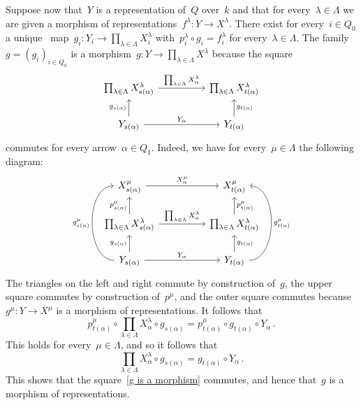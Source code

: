 Suppose now that~$Y$ is a representation of~$Q$ over~$k$ and that for every~$\lambda \in \Lambda$ we are given a morphism of representations~$f^\lambda \colon Y \to X^\lambda$.
There exist for every~$i \in Q_0$ a unique~{\klin} map~$g_i \colon Y_i \to \prod_{\lambda \in \Lambda} X^\lambda_i$ with~$p^\lambda_i \circ g_i = f^\lambda_i$ for every~$\lambda \in \Lambda$.
The family~$g = (g_i)_{i \in Q_0}$ is a morphism~$g \colon Y \to \prod_{\lambda \in \Lambda} X^\lambda$ because the square
\begin{equation}
  \label{g is a morphism}
  \begin{tikzcd}[column sep = huge]
      \prod_{\lambda \in \Lambda} X^\lambda_{s(\alpha)}
      \arrow{r}[above]{\prod_{\lambda \in \Lambda} X^\lambda_\alpha}
    & \prod_{\lambda \in \Lambda} X^\lambda_{t(\alpha)}
    \\
      Y_{s(\alpha)}
      \arrow{u}[left]{g_{s(\alpha)}}
      \arrow{r}[above]{Y_\alpha}
    & Y_{t(\alpha)}
      \arrow{u}[right]{g_{t(\alpha)}}
  \end{tikzcd}
\end{equation}
commutes for every arrow~$\alpha \in Q_1$.
Indeed, we have for every~$\mu \in \Lambda$ the following diagram:
\[
  \begin{tikzcd}[column sep = huge]
      X^\mu_{s(\alpha)}
      \arrow{r}[above]{X^\mu_\alpha}
    & X^\mu_{t(\alpha)}
    \\
      \prod_{\lambda \in \Lambda} X^\lambda_{s(\alpha)}
      \arrow{u}[left]{p^\mu_{s(\alpha)}}
      \arrow{r}[above]{\prod_{\lambda \in \Lambda} X^\lambda_\alpha}
    & \prod_{\lambda \in \Lambda} X^\lambda_{t(\alpha)}
      \arrow{u}[right]{p^\mu_{t(\alpha)}}
    \\
      Y_{s(\alpha)}
      \arrow[bend left = 90]{uu}[left]{g^\mu_{s(\alpha)}}
      \arrow{u}[left]{g_{s(\alpha)}}
      \arrow{r}[above]{Y_\alpha}
    & Y_{t(\alpha)}
      \arrow[bend right = 90]{uu}[right]{g^\mu_{t(\alpha)}}
      \arrow{u}[right]{g_{t(\alpha)}}
  \end{tikzcd}
\]
The triangles on the left and right commute by construction of~$g$, the upper square commutes by construction of~$p^\mu$, and the outer square commutes because~$g^\mu \colon Y \to X^\mu$ is a morphism of representations.
It follows that
\[
    p^\mu_{t(\alpha)} \circ \prod_{\lambda \in \Lambda} X^\lambda_\alpha \circ g_{s(\alpha)}
  = p^\mu_{t(\alpha)} \circ g_{t(\alpha)} \circ Y_\alpha \,.
\]
This holds for every~$\mu \in \Lambda$, and so it follows that
\[
    \prod_{\lambda \in \Lambda} X^\lambda_\alpha \circ g_{s(\alpha)}
  = g_{t(\alpha)} \circ Y_\alpha \,.
\]
This shows that the square~\eqref{g is a morphism} commutes, and hence that~$g$ is a morphism of representations.

